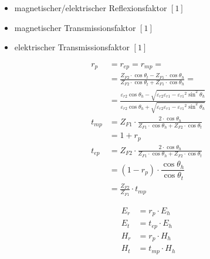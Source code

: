 \begin{itemize}
    \item magnetischer/elektrischer Reflexionsfaktor $[1]$
    \item magnetischer Transmissionsfaktor $[1]$
    \item elektrischer Transmissionsfaktor $[1]$
\end{itemize}
\begin{align*}
    r_p     & =  r_{e p} = r_{m p} =                                                                                                                                                                                                      \\
            & = \frac{Z_{F 2} \cdot \cos \theta_t-Z_{F 1} \cdot \cos \theta_h}{Z_{F 2} \cdot \cos \theta_t+Z_{F 1} \cdot \cos \theta_h} =                                                                                                 \\
            & = \frac{\varepsilon_{r2}\cos\theta_h-\sqrt{\varepsilon_{r2}\varepsilon_{r1}-{\varepsilon_{r1}}^2\sin^2\theta_h}}{\varepsilon_{r2}\cos\theta_h+\sqrt{{\varepsilon_{r2}\varepsilon_{r1}-{\varepsilon_{r1}}^2\sin^2\theta_h}}} \\
    t_{m p} & = Z_{F 1} \cdot \frac{2 \cdot \cos \theta_h}{Z_{F 1} \cdot \cos \theta_h+Z_{F 2} \cdot \cos \theta_t}                                                                                                                       \\
            & = 1+r_{p}                                                                                                                                                                                                                   \\
    t_{e p} & = Z_{F 2} \cdot \frac{2 \cdot \cos \theta_h}{Z_{F 1} \cdot \cos \theta_h+Z_{F 2} \cdot \cos \theta_t}                                                                                                                       \\
            & = (1-r_{p}) \cdot \dfrac{\cos \theta_h}{\cos \theta_t}                                                                                                                                                                    \\
            & = \frac{Z_{F2}}{Z_{F1}}\cdot t_{mp}
\end{align*}

\begin{align*}
    E_{r} & = r_{p} \cdot E_{h}   \\
    E_{t} & = t_{e p} \cdot E_{h} \\
    H_{r} & = r_{p} \cdot H_{h}   \\
    H_{t} & = t_{m p} \cdot H_{h} \\
\end{align*}

